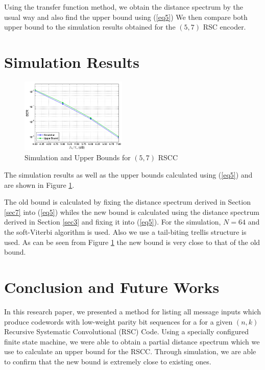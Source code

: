 \documentclass[conference]{IEEEtran}
\begin{document}
Using the transfer function method, we obtain the distance spectrum by the usual way and also find the upper bound using (\ref{eq5})
We then compare both upper bound to the simulation results obtained for the $(5,7)$ RSC encoder.
\section{Simulation Results}
\label{sec5}

\begin{figure}[h]
\centering
		\includegraphics[width=0.45\textwidth]{paperg2.png}
		\caption{Simulation and Upper Bounds for $(5,7)$ RSCC}
		\label{fig3}
		\end{figure}
		
		The simulation results as well as the upper bounds calculated using (\ref{eq5}) and are shown in Figure \ref{fig3}. 
		
		The old bound is calculated by fixing  the distance spectrum derived in Section \ref{sec7} into  (\ref{eq5}) whiles the new bound is calculated using the distance spectrum derived in Section \ref{sec3} and fixing it into (\ref{eq5}). For the simulation, $N=64$ and the soft-Viterbi algorithm is used. Also we use a tail-biting trellis structure is used. As can be seen from Figure \ref{fig3} the new bound is very close to that of the old bound.
		
\section{Conclusion and Future Works}
\label{sec6}
In this research paper, we presented a method for listing all message inputs which produce codewords with low-weight parity bit sequences for a for a given $(n,k)$ Recursive Systematic Convolutional (RSC) Code. Using a specially configured finite state machine, we were able to obtain a partial distance spectrum which we use to calculate an upper bound for the RSCC. Through simulation, we are able to confirm that the new bound is extremely close to existing ones. 
\end{document}
